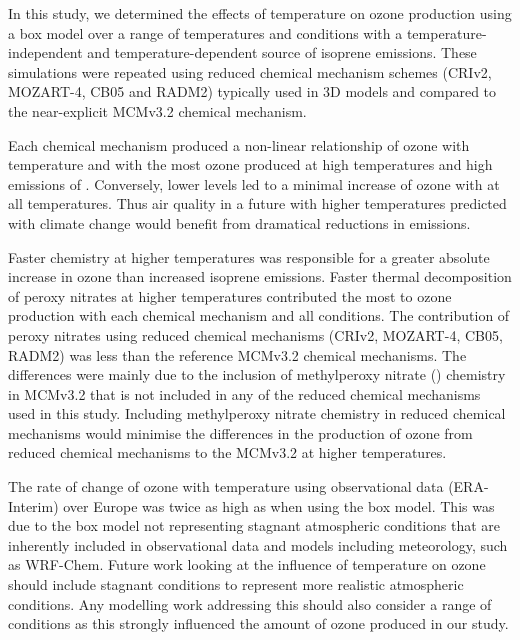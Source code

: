 In this study, we determined the effects of temperature on ozone production using a box model over a range of temperatures and  conditions with a temperature-independent and temperature-dependent source of isoprene emissions.
These simulations were repeated using reduced chemical mechanism schemes (CRIv2, MOZART-4, CB05 and RADM2) typically used in 3D models and compared to the near-explicit MCMv3.2 chemical mechanism.

Each chemical mechanism produced a non-linear relationship of ozone with temperature and  with the most ozone produced at high temperatures and high emissions of .
Conversely, lower  levels led to a minimal increase of ozone with at all temperatures.
Thus air quality in a future with higher temperatures predicted with climate change would benefit from dramatical reductions in  emissions.

Faster chemistry at higher temperatures was responsible for a greater absolute increase in ozone than increased isoprene emissions.
Faster thermal decomposition of peroxy nitrates at higher temperatures contributed the most to ozone production with each chemical mechanism and all  conditions.
The contribution of peroxy nitrates using reduced chemical mechanisms (CRIv2, MOZART-4, CB05, RADM2) was less than the reference MCMv3.2 chemical mechanisms.
The differences were mainly due to the inclusion of methylperoxy nitrate () chemistry in MCMv3.2 that is not included in any of the reduced chemical mechanisms used in this study.
Including methylperoxy nitrate chemistry in reduced chemical mechanisms would minimise the differences in the production of ozone from reduced chemical mechanisms to the MCMv3.2 at higher temperatures.

The rate of change of ozone with temperature using observational data (ERA-Interim) over Europe was twice as high as when using the box model.
This was due to the box model not representing stagnant atmospheric conditions that are inherently included in observational data and models including meteorology, such as WRF-Chem.
Future work looking at the influence of temperature on ozone should include stagnant conditions to represent more realistic atmospheric conditions.
Any modelling work addressing this should also consider a range of  conditions as this strongly influenced the amount of ozone produced in our study.
